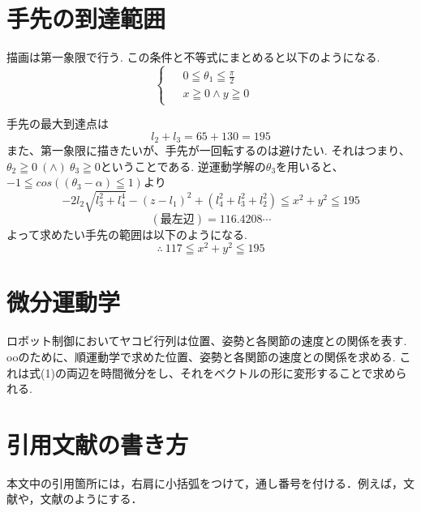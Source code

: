 \documentclass[10pt]{jarticle}
\begin{document}
	\section{手先の到達範囲}
	描画は第一象限で行う.
	この条件と不等式にまとめると以下のようになる.
	\begin{equation*}
		\left\{
			\begin{array}{c}
				\begin{split}
					&  0  \leqq  \theta_1  \leqq  \frac{\pi}{2}  &  \\
					&  x  \geqq  0  \land  y  \geqq  0
				\end{split}
			\end{array}
		\right.
	\end{equation*}

	手先の最大到達点は
	\begin{equation*}
		l_2+l_3  =  65+130  =  195
	\end{equation*}
	また、第一象限に描きたいが、手先が一回転するのは避けたい.
	それはつまり、$  \theta_2  \geqq  0\  (\land)  \  \theta_3  \geqq0$ということである.
	逆運動学解の$\theta_3$を用いると、$  -1  \leqq  cos((\theta_3  -  \alpha)  \leqq  1)$より
	\begin{equation*}
		-2l_2\sqrt{l_3^2+l_4^4}  - (z-l_1)^2  +  (l_4^2  +  l_3^2  +  l_2^2)  \leqq  x^2  +  y^2  \leqq  195
	\end{equation*}
	$$
		(\text{最左辺})  =  116.4208  \cdots
	$$
	よって求めたい手先の範囲は以下のようになる.
	\begin{equation*}
		\therefore\  117  \leqq  x^2  +  y^2  \leqq  195
	\end{equation*}

	\section{微分運動学}
	ロボット制御においてヤコビ行列は位置、姿勢と各関節の速度との関係を表す.
	ooのために、順運動学で求めた位置、姿勢と各関節の速度との関係を求める.
	これは式(1)の両辺を時間微分をし、それをベクトルの形に変形することで求められる.



    
    \section{引用文献の書き方}%
    本文中の引用箇所には，右肩に小括弧をつけて，通し番号を付ける．例えば，文献\cite{工大2005}や，文献\cite{Shibutani2004, Handbook1979, Kikuchi2017, Adrobo2019}のようにする．
    
\end{document}
